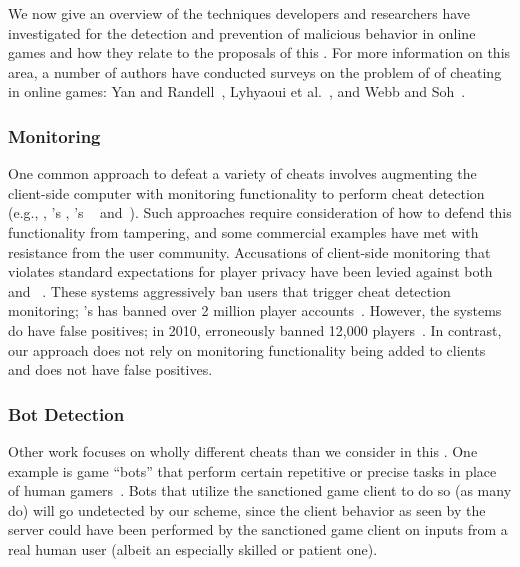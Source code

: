 We now give an overview of the techniques developers and researchers
have investigated for the detection and prevention of malicious
behavior in online games and how they relate to the proposals of this
\dissertation. For more information on this area, a number of authors
have conducted surveys on the problem of of cheating in online games:
Yan and Randell~\cite{yan05:classification}, Lyhyaoui et
al.~\cite{lyhyaoui05:categorization}, and Webb and
Soh~\cite{webb08:survey}. 


\subsubsection{Monitoring}
One common approach to defeat a variety of cheats involves augmenting
the client-side computer with monitoring functionality to perform
cheat detection (e.g., \punkbuster, \wow's \warden, \valve's
\vac~\cite{valve15:vac}
and~\cite{delap04:verification,feng08:stealth,kaiser09:fides,monch06:protecting,schluessler07:bot}).
Such approaches require consideration of how to defend this
functionality from tampering, and some commercial examples have met
with resistance from the user community. Accusations of client-side
monitoring that violates standard expectations for player privacy have
been levied against both \warden~\cite{ward05:warcraft} and
\vac~\cite{bright14:vacdns}. These systems aggressively ban users that
trigger cheat detection monitoring; \valve's \vac has banned
over 2 million player accounts~\cite{surian:banned}. However, the systems
do have false positives; in 2010, \valve 
erroneously banned 12,000 players~\cite{meer10:falseban}. In
contrast, our approach does not rely on monitoring functionality being
added to clients and does not have false positives.

\subsubsection{Bot Detection}
Other work focuses on wholly different cheats than we consider in this
\dissertation.  One example is game ``bots'' that perform certain
repetitive or precise tasks in place of human
gamers~\cite{chen06:bot,schluessler07:bot,yampolskly07:bot,chen08:manifold,mitterhofer09:bot}.
Bots that utilize the sanctioned game client to do so (as many do)
will go undetected by our scheme, since the client behavior as seen by
the server could have been performed by the sanctioned game client on
inputs from a real human user (albeit an especially skilled or patient
one).  

